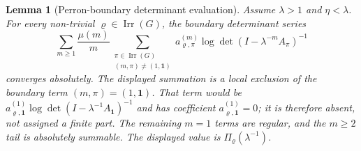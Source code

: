 \documentclass[11pt,a4paper]{amsart}
\theoremstyle{plain}
\newtheorem{lemma}[theorem]{Lemma}
\theoremstyle{definition}
\theoremstyle{remark}
\DeclareMathOperator{\Irr}{Irr}
\begin{document}
\begin{lemma}[Perron-boundary determinant evaluation]
  \label{lem:fixed-label-perron-determinant-evaluation}
  \label{lem:perron-boundary-determinant-evaluation}
  Assume \(\lambda>1\) and \(\eta<\lambda\). For every non-trivial
  \(\varrho\in\Irr(G)\), the boundary determinant series
  \[
    \sum_{m\ge 1}\frac{\mu(m)}{m}
      \sum_{\substack{\pi\in\Irr(G)\\(m,\pi)\neq(1,\mathbf 1)}}
        a_{\varrho,\pi}^{(m)}
        \log\det(I-\lambda^{-m}A_\pi)^{-1}
  \]
  converges absolutely. The displayed summation is a local exclusion of
  the boundary term \((m,\pi)=(1,\mathbf1)\). That term would be
  \(a_{\varrho,\mathbf 1}^{(1)}
  \log\det(I-\lambda^{-1}A_{\mathbf1})^{-1}\) and has coefficient
  \(a_{\varrho,\mathbf 1}^{(1)}=0\); it is therefore absent, not assigned
  a finite part. The remaining \(m=1\) terms are regular, and the
  \(m\ge2\) tail is absolutely summable. The displayed value is
  \(\Pi_\varrho(\lambda^{-1})\).
\end{lemma}
\end{document}
